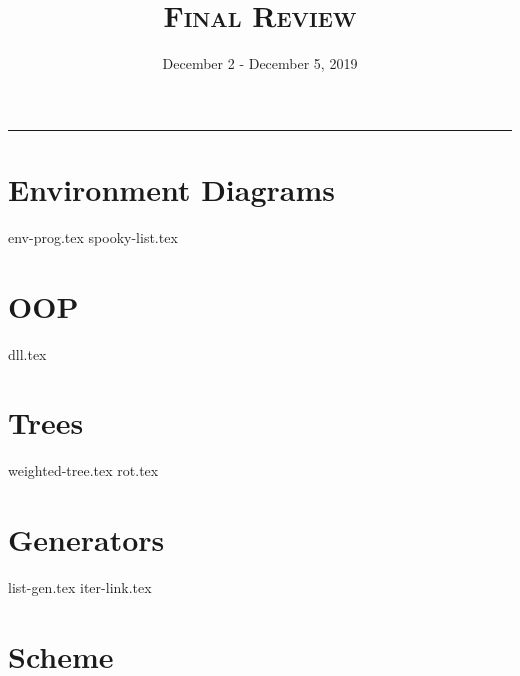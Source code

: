 \documentclass{exam}
\title{\textsc{Final Review}}
\date{December 2 - December 5, 2019}
\begin{document}
\maketitle\rule{\textwidth}{0.15em}
\fontsize{12}{15}\selectfont

\section{Environment Diagrams}
\begin{questions}
{env-prog.tex}
{spooky-list.tex}
\end{questions}

\section{OOP}
\begin{questions}
{dll.tex}
\end{questions}

\section{Trees}
\begin{questions}
{weighted-tree.tex}
{rot.tex}
\end{questions}

\section{Generators}
\begin{questions}
{list-gen.tex}
{iter-link.tex}
\end{questions}

\section{Scheme}
\begin{questions}

\end{questions}
\end{document}
